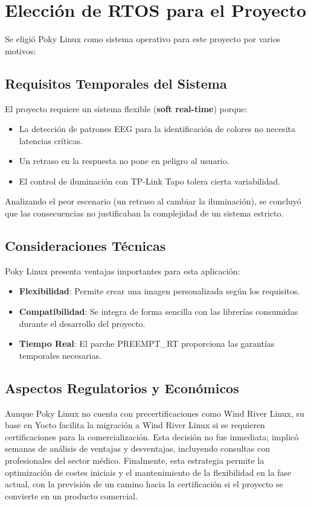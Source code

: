 \newpage
\section{Elección de RTOS para el Proyecto}
    Se eligió Poky Linux como sistema operativo para este proyecto por varios motivos:

    \subsection{Requisitos Temporales del Sistema}
        El proyecto requiere un sistema flexible (\textbf{soft real-time}) porque:
        \begin{itemize}
            \item La detección de patrones EEG para la identificación de colores no necesita latencias críticas.
            \item Un retraso en la respuesta no pone en peligro al usuario.
            \item El control de iluminación con TP-Link Tapo tolera cierta variabilidad.
        \end{itemize}

        Analizando el peor escenario (un retraso al cambiar la iluminación), se concluyó que las consecuencias no justificaban la complejidad de un sistema estricto.

    \subsection{Consideraciones Técnicas}
        Poky Linux presenta ventajas importantes para esta aplicación:
        \begin{itemize}
            \item \textbf{Flexibilidad}: Permite crear una imagen personalizada según los requisitos.
            \item \textbf{Compatibilidad}: Se integra de forma sencilla con las librerías consumidas durante el desarrollo del proyecto.
            \item \textbf{Tiempo Real}: El parche PREEMPT\_RT proporciona las garantías temporales necesarias.
        \end{itemize}

    \subsection{Aspectos Regulatorios y Económicos}
        Aunque Poky Linux no cuenta con precertificaciones como Wind River Linux, su base en Yocto facilita la migración a Wind River Linux si se requieren certificaciones para la comercialización. Esta decisión no fue inmediata; implicó semanas de análisis de ventajas y desventajas, incluyendo consultas con profesionales del sector médico. Finalmente, esta estrategia permite la optimización de costes iniciais y el mantenimiento de la flexibilidad en la fase actual, con la previsión de un camino hacia la certificación si el proyecto se convierte en un producto comercial.

